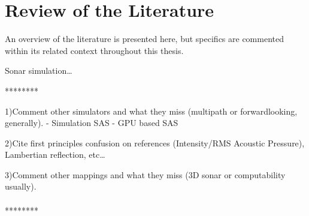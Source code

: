 \section{Review of the Literature}

An overview of the literature is presented here, but specifics are commented
within its related context throughout this thesis.

Sonar simulation\ldots

********

1)Comment other simulators and what they miss (multipath or forwardlooking,
generally).
\citet{Coiras2009} - Simulation SAS
\citet{coiras2009gpu} - GPU based SAS

2)Cite first principles confusion on references (Intensity/RMS Acoustic
Pressure), Lambertian reflection, etc\ldots

3)Comment other mappings and what they miss (3D sonar or computability usually).
\\\\
******** 
